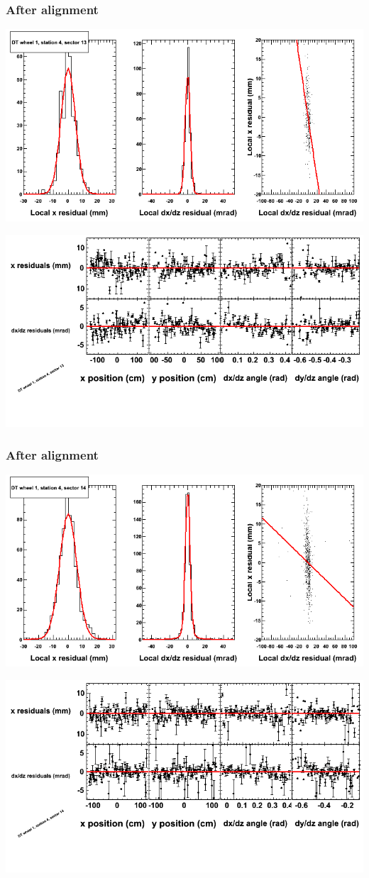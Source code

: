 \documentclass[compress]{beamer}
\begin{document}
\begin{frame}
\frametitle{After alignment}
\includegraphics[width=0.7\linewidth]{NOV4_fitfunctions/MBwhDst4sec13_bellcurves.png}

\includegraphics[width=0.7\linewidth]{NOV4_fitfunctions/MBwhDst4sec13_polynomials.png}
\end{frame}

\begin{frame}
\frametitle{After alignment}
\includegraphics[width=0.7\linewidth]{NOV4_fitfunctions/MBwhDst4sec14_bellcurves.png}

\includegraphics[width=0.7\linewidth]{NOV4_fitfunctions/MBwhDst4sec14_polynomials.png}
\end{frame}
\end{document}
